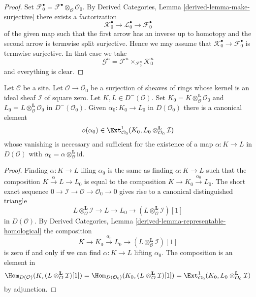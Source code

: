 \begin{proof}
Set $\mathcal{F}_0^\bullet =
\mathcal{F}^\bullet \otimes_\mathcal{O} \mathcal{O}_0$.
By Derived Categories, Lemma \ref{derived-lemma-make-surjective}
there exists a factorization
$$
\mathcal{K}_0^\bullet \to \mathcal{L}_0^\bullet \to \mathcal{F}_0^\bullet
$$
of the given map such that the first arrow has an inverse up
to homotopy and the second arrow is termwise split surjective.
Hence we may assume that $\mathcal{K}_0^\bullet \to \mathcal{F}_0^\bullet$
is termwise surjective.
In that case we take
$$
\mathcal{G}^n = \mathcal{F}^n \times_{\mathcal{F}^n_0} \mathcal{K}_0^n
$$
and everything is clear.
\end{proof}

\begin{lemma}
\label{lemma-inf-obs-map-defo-complex}
Let $\mathcal{C}$ be a site. Let $\mathcal{O} \to \mathcal{O}_0$
be a surjection of sheaves of rings whose kernel is an ideal sheaf
$\mathcal{I}$ of square zero. Let $K, L \in D^-(\mathcal{O})$.
Set $K_0 = K \otimes_\mathcal{O}^\mathbf{L} \mathcal{O}_0$
and $L_0 = L \otimes_\mathcal{O}^\mathbf{L} \mathcal{O}_0$
in $D^-(\mathcal{O}_0)$. Given $\alpha_0 : K_0 \to L_0$ in $D(\mathcal{O}_0)$
there is a canonical element
$$
o(\alpha_0) \in \Ext^1_{\mathcal{O}_0}(K_0,
L_0 \otimes_{\mathcal{O}_0}^\mathbf{L} \mathcal{I})
$$
whose vanishing is necessary and sufficient for the
existence of a map $\alpha : K \to L$ in $D(\mathcal{O})$
with $\alpha_0 = \alpha \otimes_\mathcal{O}^\mathbf{L} \text{id}$.
\end{lemma}

\begin{proof}
Finding $\alpha : K \to L$ lifing $\alpha_0$ is the same as finding
$\alpha : K \to L$ such that the composition $K \xrightarrow{\alpha} L \to L_0$
is equal to the composition $K \to K_0 \xrightarrow{\alpha_0} L_0$.
The short exact sequence
$0 \to \mathcal{I} \to \mathcal{O} \to \mathcal{O}_0 \to 0$
gives rise to a canonical distinguished triangle
$$
L \otimes_\mathcal{O}^\mathbf{L} \mathcal{I} \to
L \to
L_0 \to
(L \otimes_\mathcal{O}^\mathbf{L} \mathcal{I})[1]
$$
in $D(\mathcal{O})$.
By Derived Categories, Lemma \ref{derived-lemma-representable-homological}
the composition
$$
K \to K_0 \xrightarrow{\alpha_0} L_0 \to
(L \otimes_\mathcal{O}^\mathbf{L} \mathcal{I})[1]
$$
is zero if and only if we can find $\alpha : K \to L$
lifting $\alpha_0$. The composition is an element in
$$
\Hom_{D(\mathcal{O})}(K, (L \otimes_\mathcal{O}^\mathbf{L} \mathcal{I})[1]) =
\Hom_{D(\mathcal{O}_0)}(K_0,
(L \otimes_\mathcal{O}^\mathbf{L} \mathcal{I})[1]) =
\Ext^1_{\mathcal{O}_0}(K_0,
L_0 \otimes_{\mathcal{O}_0}^\mathbf{L} \mathcal{I})
$$
by adjunction.
\end{proof}

